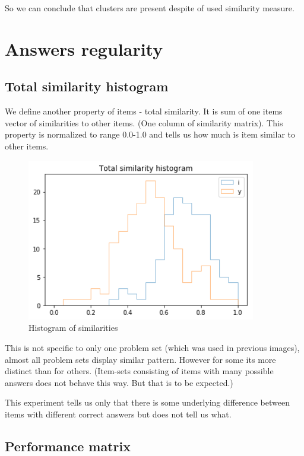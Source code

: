 \documentclass[
  digital, %
  table,   %
  nolof,     %
  nolot,     %
  nocover
]{fithesis3}
\begin{document}
So we can conclude that clusters are present despite of used similarity measure.

\section{Answers regularity}

\subsection{Total similarity histogram}

We define another property of items - total similarity. It is sum of one items vector of similarities to other items. (One column of similarity matrix). This property is normalized to range 0.0-1.0 and tells us how much is item similar to other items.

\begin{figure}
  \includegraphics[width=10cm]{img/histogram_i_y}
  \caption{Histogram of similarities}
  \label{fig:histogram_i_y}
\end{figure}



This is not specific to only one problem set (which was used in previous images), almost all problem sets display similar pattern. However for some its more distinct than for others. (Item-sets consisting of items with many possible answers does not behave this way. But that is to be expected.)

This experiment tells us only that there is some underlying difference between items with different correct answers but does not tell us what.

\subsection{Performance matrix}
\end{document}
